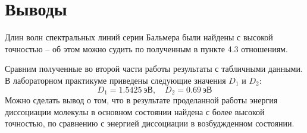 \documentclass[14pt, a4paper]{report}
\begin{document}
\section{Выводы}

Длин волн спектральных линий серии Бальмера были найдены с высокой точностью -- об этом можно судить по полученным в пункте 4.3 отношениям.

Сравним полученные во второй части работы результаты с табличными данными. В лабораторном практикуме приведены следующие значения $D_1$ и $D_2$:
\[D_1=1.5425\ эВ,\quad D_2=0.69\ эВ\]
Можно сделать вывод о том, что в результате проделанной работы энергия диссоциации молекулы в основном состоянии найдена с более высокой точностью, по сравнению с энергией диссоциации в возбуджденном состоянии.
\end{document}
